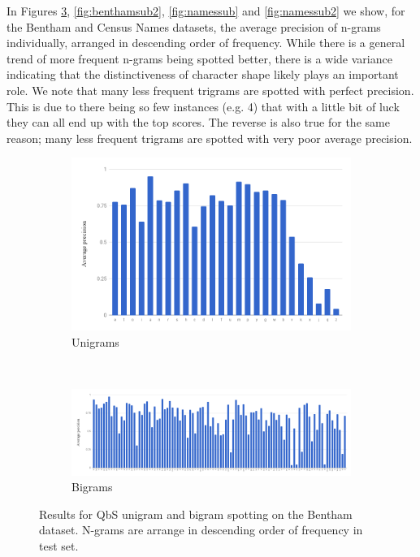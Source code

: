 \documentclass[ms,electronic,twosidetoc,letterpaper,chaptercenter,parttop,lof,lot]{byumsphd}
\begin{document}
In Figures \ref{fig:benthamsub}, \ref{fig:benthamsub2}, \ref{fig:namessub} and \ref{fig:namessub2} we show, for the Bentham and Census Names datasets, the average precision of n-grams individually, arranged in descending order of frequency. While there is a general trend of more frequent n-grams being spotted better, there is a wide variance indicating that the distinctiveness of character shape likely plays an important role. We note that many less frequent trigrams are spotted with perfect precision. This is due to there being so few instances (e.g. 4) that with a little bit of luck they can all end up with the top scores. The reverse is also true for the same reason; many less frequent trigrams are spotted with very poor average precision.

\begin{figure}
\centering
\begin{subfigure}{.99\textwidth}
  \centering
  \includegraphics[width=.75\linewidth]{benthamUniSpot}
  \caption{Unigrams}
  \label{fig:benthamUniSpot}
\end{subfigure}
\\
\begin{subfigure}{.99\textwidth}
  \centering
  \includegraphics[width=.99\linewidth]{benthamBiSpot}
  \caption{Bigrams}
  \label{fig:benthamBiSpot}
\end{subfigure}
\caption{Results for QbS unigram and bigram spotting on the Bentham dataset. N-grams are arrange in descending order of frequency in test set.}
\label{fig:benthamsub}
\end{figure}
\end{document}
